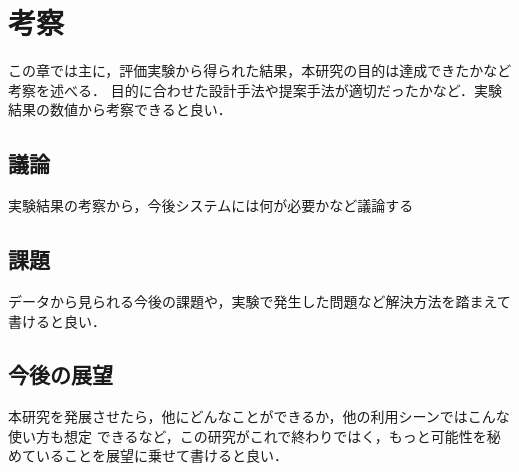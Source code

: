 \chapter{考察}
この章では主に，評価実験から得られた結果，本研究の目的は達成できたかなど考察を述べる．
目的に合わせた設計手法や提案手法が適切だったかなど．実験結果の数値から考察できると良い．


\section{議論}
実験結果の考察から，今後システムには何が必要かなど議論する


\section{課題}
データから見られる今後の課題や，実験で発生した問題など解決方法を踏まえて書けると良い．


\section{今後の展望}
本研究を発展させたら，他にどんなことができるか，他の利用シーンではこんな使い方も想定
できるなど，この研究がこれで終わりではく，もっと可能性を秘めていることを展望に乗せて書けると良い．





